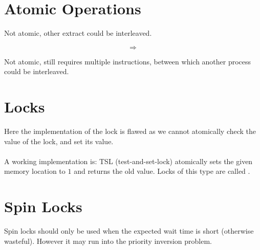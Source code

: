 \documentclass{report}
\begin{document}
\section*{Atomic Operations}
\begin{minipage}[t]{0.4 \textwidth}
	Not atomic, other extract could be interleaved.
\end{minipage}
\begin{minipage}[t]{0.2 \textwidth}
	\begin{huge}
		\[\Rightarrow\]
	\end{huge}
\end{minipage}
\begin{minipage}[t]{0.4 \textwidth}
	Not atomic, still requires multiple instructions, between which another process could be interleaved.
\end{minipage}
\section*{Locks}
Here the implementation of the lock is flawed as we cannot atomically check the value of the lock, and set its value.
\\
\\ A working implementation is:
TSL (test-and-set-lock) atomically sets the given memory location to $1$ and returns the old value. Locks of this type are called .
\section*{Spin Locks}
Spin locks should only be used when the expected wait time is short (otherwise wasteful). However it may run into the priority inversion problem.
\end{document}
